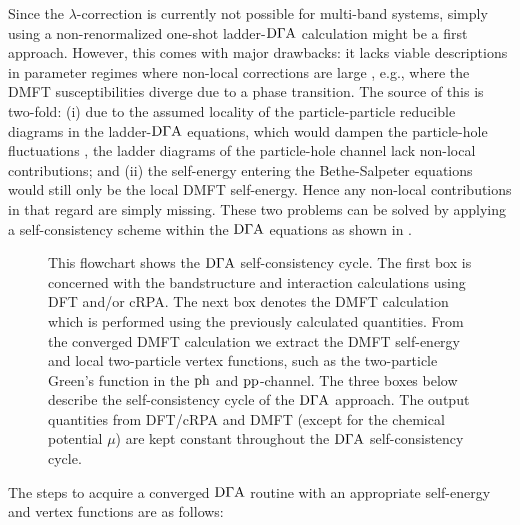 \documentclass[../../main.tex]{subfiles}
\begin{document}
Since the $\lambda$-correction is currently not possible for multi-band systems, simply using a non-renormalized one-shot ladder-$\text{D}\Gamma\text{A}$ calculation might be a first approach. However, this comes with major drawbacks: it lacks viable descriptions in parameter regimes where non-local corrections are large \cite{sc ladder dga josef}, e.g., where the DMFT susceptibilities diverge due to a phase transition. The source of this is two-fold: (i) due to the assumed locality of the particle-particle reducible diagrams in the ladder-$\text{D}\Gamma\text{A}$ equations, which would dampen the particle-hole fluctuations \cite{rohringer impact of nonlocal}, the ladder diagrams of the particle-hole channel lack non-local contributions; and (ii) the self-energy entering the Bethe-Salpeter equations would still only be the local DMFT self-energy. Hence any non-local contributions in that regard are simply missing. These two problems can be solved by applying a self-consistency scheme within the $\text{D}\Gamma\text{A}$ equations as shown in .
\begin{figure}[ht!]
	\centering
  	
  	\caption{This flowchart shows the $\text{D}\Gamma\text{A}$ self-consistency cycle. The first box is concerned with the bandstructure and interaction calculations using DFT and/or cRPA. The next box denotes the DMFT calculation which is performed using the previously calculated quantities. From the converged DMFT calculation we extract the DMFT self-energy and local two-particle vertex functions, such as the two-particle Green's function in the $\text{ph}$ and $\text{pp}$-channel. The three boxes below describe the self-consistency cycle of the $\text{D}\Gamma\text{A}$ approach. The output quantities from DFT/cRPA and DMFT (except for the chemical potential $\mu$) are kept constant throughout the $\text{D}\Gamma\text{A}$ self-consistency cycle.}
  	\label{fig:flowchart_self_consistency}
\end{figure}
The steps to acquire a converged $\text{D}\Gamma\text{A}$ routine with an appropriate self-energy and vertex functions are as follows:
\end{document}
